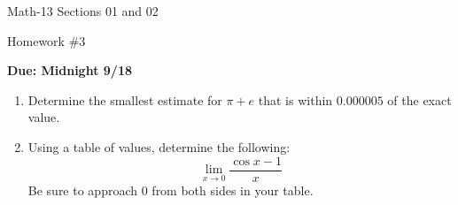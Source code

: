 \documentclass[letterpaper,12pt,fleqn]{article}
\begin{document}
\begin{center}
  \large
  Math-13 Sections 01 and 02

  \Large
  Homework \#3

  \large
  \textbf{Due: Midnight 9/18}
\end{center}

\begin{enumerate}
\item Determine the smallest estimate for \(\pi+e\) that is within \(0.000005\) of the exact value.

\item Using a table of values, determine the following:
  \[\lim_{x\to0}\frac{\cos x-1}{x}\]
  Be sure to approach \(0\) from both sides in your table.
\end{enumerate}
\end{document}
